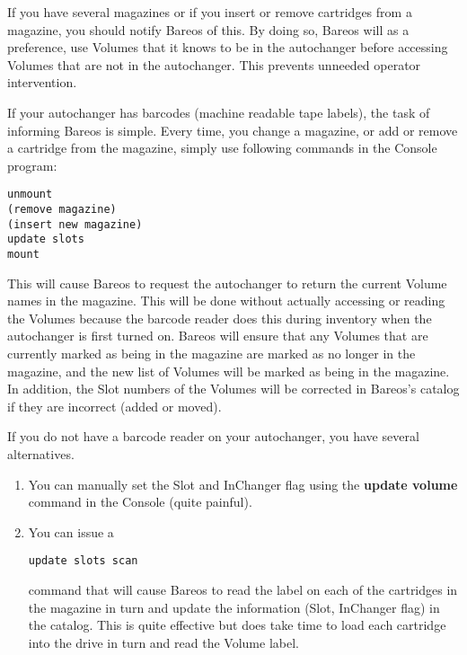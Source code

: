 If you have several magazines or if you insert or remove cartridges from a
magazine, you should notify Bareos of this. By doing so, Bareos will as
a preference, use Volumes that it knows to be in the autochanger before
accessing Volumes that are not in the autochanger. This prevents unneeded
operator intervention.

If your autochanger has barcodes (machine readable tape labels), the task of
informing Bareos is simple. Every time, you change a magazine, or add or
remove a cartridge from the magazine, simply use following commands in the Console program:

\footnotesize
\begin{verbatim}
unmount
(remove magazine)
(insert new magazine)
update slots
mount
\end{verbatim}
\normalsize

This will cause Bareos to request the autochanger to
return the current Volume names in the magazine. This will be done without
actually accessing or reading the Volumes because the barcode reader does this
during inventory when the autochanger is first turned on. Bareos will ensure
that any Volumes that are currently marked as being in the magazine are marked
as no longer in the magazine, and the new list of Volumes will be marked as
being in the magazine. In addition, the Slot numbers of the Volumes will be
corrected in Bareos's catalog if they are incorrect (added or moved).

If you do not have a barcode reader on your autochanger, you have several
alternatives.

\begin{enumerate}
\item You can manually set the Slot and InChanger flag using  the {\bf update
   volume} command in the Console (quite  painful).

\item You can issue a

\footnotesize
\begin{verbatim}
update slots scan
\end{verbatim}
\normalsize

   command that will cause Bareos to read the label on each  of the cartridges in
   the magazine in turn and update the  information (Slot, InChanger flag) in the
   catalog. This  is quite effective but does take time to load each cartridge
   into the drive in turn and read the Volume label.

\end{enumerate}

